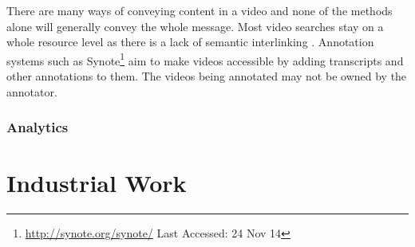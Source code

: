 There are many ways of conveying content in a video and none of the methods alone will generally convey the whole message. Most video searches stay on a whole resource level as there is a lack of semantic interlinking \citep{eps273063}. Annotation systems such as Synote\footnote{\url{http://synote.org/synote/} Last Accessed: 24 Nov 14} aim to make videos accessible by adding transcripts and other annotations to them. The videos being annotated may not be owned by the annotator.

\subsubsection{Analytics}
\label{Subsubsection:Analytics}



\newif\ifnote
\notefalse
\ifnote
In \cite{eps265979}:
R2Q2 (deprecated - replaced by QTI Engine)
Constructr - constructr.qtitools.org - proof-of-concept
Playr - playr.qtitools.org - deprecated - effectively our overlays
\fi

\section{Industrial Work} 
\label{Section:Industrial Work}
